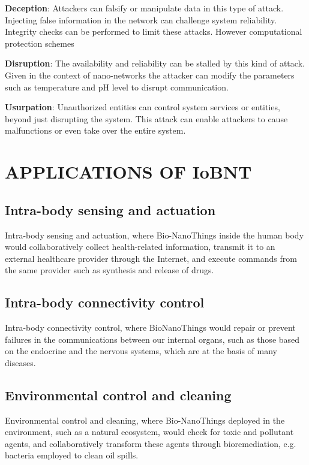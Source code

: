 \documentclass[12pt,a4paper]{report}
\begin{document}
\textbf{Deception}: Attackers can falsify or manipulate data in
 this type of attack. Injecting false information in the network
  can challenge system reliability. Integrity checks can be 
  performed to limit these attacks. However computational protection schemes

\textbf{Disruption}: The availability and reliability can be 
stalled by this kind of attack. Given in the context of
 nano-networks the attacker can modify the parameters such
  as temperature and pH level to disrupt communication.

\textbf{Usurpation}: Unauthorized entities can control system 
services or entities, beyond just disrupting the system. This 
attack can enable attackers to cause malfunctions or even take 
over the entire system.

\chapter{APPLICATIONS OF IoBNT}
\section{Intra-body sensing and actuation}
Intra-body sensing and actuation, where
Bio-NanoThings inside the human body
would collaboratively collect health-related
information, transmit it to an external
healthcare provider through the Internet,
and execute commands from the same provider such as synthesis and release of drugs.
\section{ Intra-body connectivity control}
 Intra-body connectivity control, where BioNanoThings would repair
  or prevent failures in the communications between our internal 
  organs, such as those based on the
endocrine and the nervous systems, which
are at the basis of many diseases.
\section{Environmental control and cleaning}
Environmental control and cleaning, where
Bio-NanoThings deployed in the environment, such as a natural ecosystem, would
check for toxic and pollutant agents, and
collaboratively transform these agents
through bioremediation, e.g. bacteria
employed to clean oil spills.
\end{document}
